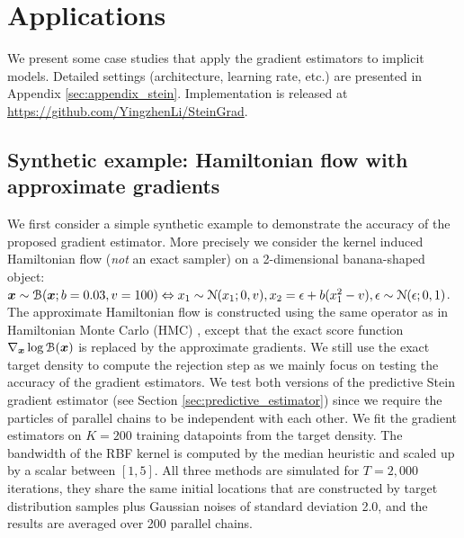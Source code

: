\section{Applications}
We present some case studies that apply the gradient estimators to implicit models. Detailed settings (architecture, learning rate, etc.) are presented in Appendix \ref{sec:appendix_stein}. Implementation is released at \url{https://github.com/YingzhenLi/SteinGrad}.

\subsection{Synthetic example: Hamiltonian flow with approximate gradients}
We first consider a simple synthetic example to demonstrate the accuracy of the proposed gradient estimator. More precisely we consider the kernel induced Hamiltonian flow (\emph{not} an exact sampler) \citep{strathmann:kmc2015} on a 2-dimensional banana-shaped object: $\bm{x} \sim \mathcal{B}(\bm{x}; b=0.03, v=100) \Leftrightarrow  x_1 \sim \mathcal{N}(x_1; 0, v), x_2 = \epsilon + b(x_1^2 - v), \epsilon \sim \mathcal{N}(\epsilon; 0, 1)$. The approximate Hamiltonian flow is constructed using the same operator as in Hamiltonian Monte Carlo (HMC) \citep{duane:hmc1987, neal:mcmc2011}, except that the exact score function $\nabla_{\bm{x}} \log \mathcal{B}(\bm{x})$ is replaced by the approximate gradients. We still use the exact target density to compute the rejection step as we mainly focus on testing the accuracy of the gradient estimators. We test both versions of the predictive Stein gradient estimator (see Section \ref{sec:predictive_estimator}) since we require the particles of parallel chains to be independent with each other. 
%
We fit the gradient estimators on $K=200$ training datapoints from the target density. The bandwidth of the RBF kernel is computed by the median heuristic and scaled up by a scalar between $[1, 5]$. All three methods are simulated for $T=2,000$ iterations, they share the same initial locations that are constructed by target distribution samples plus Gaussian noises of standard deviation 2.0, and the results are averaged over 200 parallel chains. 


